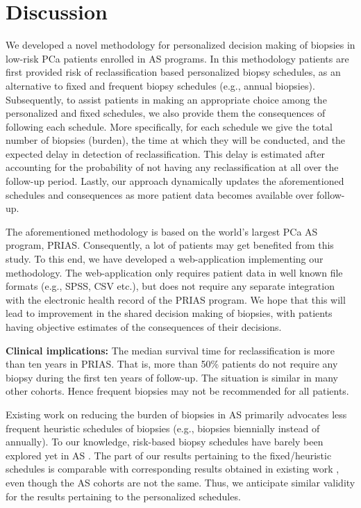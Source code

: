 \section{Discussion}
We developed a novel methodology for personalized decision making of biopsies in low-risk PCa patients enrolled in AS programs. In this methodology patients are first provided risk of reclassification based personalized biopsy schedules, as an alternative to fixed and frequent biopsy schedules (e.g., annual biopsies). Subsequently, to assist patients in making an appropriate choice among the personalized and fixed schedules, we also provide them the consequences of following each schedule. More specifically, for each schedule we give the total number of biopsies (burden), the time at which they will be conducted, and the expected delay in detection of reclassification. This delay is estimated after accounting for the probability of not having any reclassification at all over the follow-up period. Lastly, our approach dynamically updates the aforementioned schedules and consequences as more patient data becomes available over follow-up. 

The aforementioned methodology is based on the world's largest PCa AS program, PRIAS. Consequently, a lot of patients may get benefited from this study. To this end, we have developed a web-application implementing our methodology. The web-application only requires patient data in well known file formats (e.g., SPSS, CSV etc.), but does not require any separate integration with the electronic health record of the PRIAS program. We hope that this will lead to improvement in the shared decision making of biopsies, with patients having objective estimates of the consequences of their decisions. 

\textbf{Clinical implications:} The median survival time for reclassification is more than ten years in PRIAS. That is, more than 50\% patients do not require any biopsy during the first ten years of follow-up. The situation is similar in many other cohorts. Hence frequent biopsies may not be recommended for all patients.

Existing work on reducing the burden of biopsies in AS primarily advocates less frequent heuristic schedules of biopsies \citep{inoue2018comparative} (e.g., biopsies biennially instead of annually). To our knowledge, risk-based biopsy schedules have barely been explored yet in AS \citep{nieboer2018active,bruinsma2016active}. The part of our results pertaining to the fixed/heuristic schedules is comparable with corresponding results obtained in existing work \citep{inoue2018comparative}, even though the AS cohorts are not the same. Thus, we anticipate similar validity for the results pertaining to the personalized schedules.

